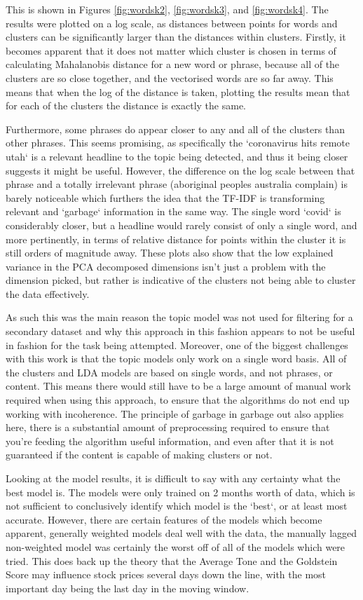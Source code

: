 This is shown in Figures \ref{fig:wordsk2}, \ref{fig:wordsk3}, and \ref{fig:wordsk4}. The results were plotted on a log scale, as distances between points for words and clusters can be significantly larger than the distances within clusters. Firstly, it becomes apparent that it does not matter which cluster is chosen in terms of calculating Mahalanobis distance for a new word or phrase, because all of the clusters are so close together, and the vectorised words are so far away. This means that when the log of the distance is taken, plotting the results mean that for each of the clusters the distance is exactly the same. 

Furthermore, some phrases do appear closer to any and all of the clusters than other phrases. This seems promising, as specifically the `coronavirus hits remote utah` is a relevant headline to the topic being detected, and thus it being closer suggests it might be useful. However, the difference on the log scale between that phrase and a totally irrelevant phrase (aboriginal peoples australia complain) is barely noticeable which furthers the idea that the TF-IDF is transforming relevant and `garbage` information in the same way. The single word `covid` is considerably closer, but a headline would rarely consist of only a single word, and more pertinently, in terms of relative distance for points within the cluster it is still orders of magnitude away. These plots also show that the low explained variance in the PCA decomposed dimensions isn't just a problem with the dimension picked, but rather is indicative of the clusters not being able to cluster the data effectively. 

As such this was the main reason the topic model was not used for filtering for a secondary dataset and why this approach in this fashion appears to not be useful in fashion for the task being attempted. Moreover, one of the biggest challenges with this work is that the topic models only work on a single word basis. All of the clusters and LDA models are based on single words, and not phrases, or content. This means there would still have to be a large amount of manual work required when using this approach, to ensure that the algorithms do not end up working with incoherence. The principle of garbage in garbage out also applies here, there is a substantial amount of preprocessing required to ensure that you're feeding the algorithm useful information, and even after that it is not guaranteed if the content is capable of making clusters or not.

Looking at the model results, it is difficult to say with any certainty what the best model is. The models were only trained on 2 months worth of data, which is not sufficient to conclusively identify which model is the `best`, or at least most accurate. However, there are certain features of the models which become apparent, generally weighted models deal well with the data, the manually lagged non-weighted model was certainly the worst off of all of the models which were tried. This does back up the theory that the Average Tone and the Goldstein Score may influence stock prices several days down the line, with the most important day being the last day in the moving window. 

